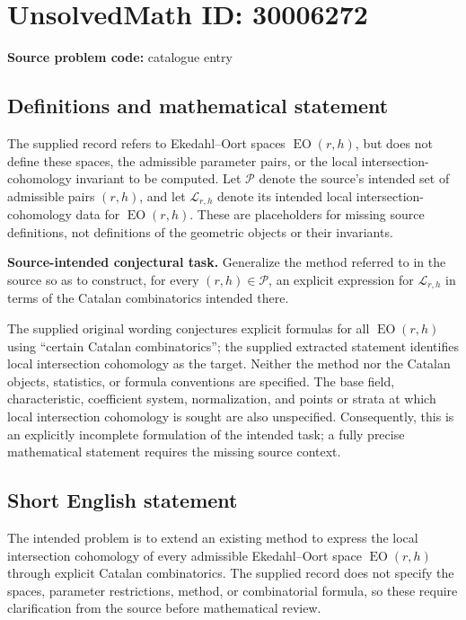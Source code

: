 \documentclass[11pt]{article}
\begin{document}
\section*{UnsolvedMath ID: 30006272}
\textbf{Source problem code:} catalogue entry
\subsection{Definitions and mathematical statement}
The supplied record refers to Ekedahl--Oort spaces \(\operatorname{EO}(r,h)\), but does not define these spaces, the admissible parameter pairs, or the local intersection-cohomology invariant to be computed. Let \(\mathcal P\) denote the source's intended set of admissible pairs \((r,h)\), and let \(\mathcal L_{r,h}\) denote its intended local intersection-cohomology data for \(\operatorname{EO}(r,h)\). These are placeholders for missing source definitions, not definitions of the geometric objects or their invariants.

\textbf{Source-intended conjectural task.} Generalize the method referred to in the source so as to construct, for every \((r,h)\in\mathcal P\), an explicit expression for \(\mathcal L_{r,h}\) in terms of the Catalan combinatorics intended there.

The supplied original wording conjectures explicit formulas for all \(\operatorname{EO}(r,h)\) using ``certain Catalan combinatorics''; the supplied extracted statement identifies local intersection cohomology as the target. Neither the method nor the Catalan objects, statistics, or formula conventions are specified. The base field, characteristic, coefficient system, normalization, and points or strata at which local intersection cohomology is sought are also unspecified. Consequently, this is an explicitly incomplete formulation of the intended task; a fully precise mathematical statement requires the missing source context.
\subsection{Short English statement}
The intended problem is to extend an existing method to express the local intersection cohomology of every admissible Ekedahl--Oort space \(\operatorname{EO}(r,h)\) through explicit Catalan combinatorics. The supplied record does not specify the spaces, parameter restrictions, method, or combinatorial formula, so these require clarification from the source before mathematical review.
\end{document}
